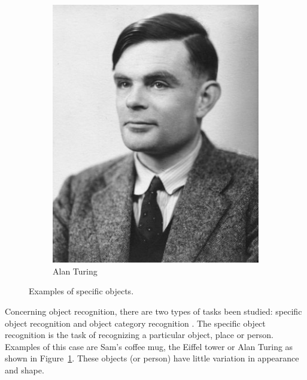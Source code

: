 \documentclass[12pt,final,twoside]{report}
\theoremstyle{plain}
\theoremstyle{definition}
\theoremstyle{remark}
\begin{document}
\begin{figure}[tbhp]
\begin{subfigure}[b]{.3\textwidth}
    \includegraphics[width=\textwidth]{turing}
    \caption{Alan Turing}
  \end{subfigure}
  \caption{Examples of specific objects.}
  \label{fig:specific}
\end{figure}

Concerning object recognition, there are two types of tasks been studied: specific object recognition and object category recognition \cite{grauman_visual_2011}. The specific object recognition is the task of recognizing a particular object, place or person. Examples of this case are Sam's coffee mug, the Eiffel tower or Alan Turing as shown in Figure~\ref{fig:specific}. These objects (or person) have little variation in appearance and shape. 
\end{document}
